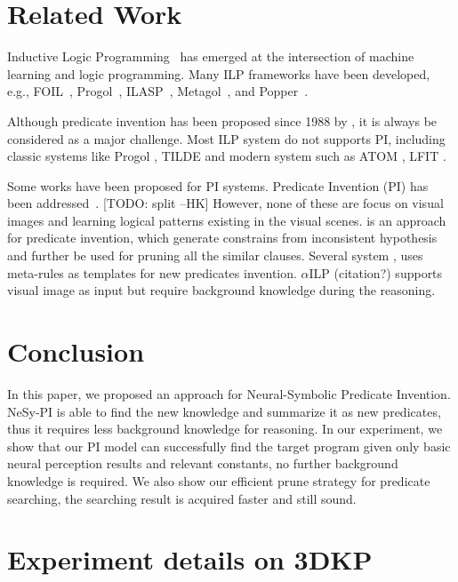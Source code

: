\documentclass[
]{ceurart}
\newcommand{\hk}[1]{\textcolor{Apricot}{[#1 \textsc{--HK}]}}
\begin{document}
	
	
	\section{Related Work}
	Inductive Logic Programming~\cite{Muggleton91,Muggleton95,Nienhuys97,Cropper20} has emerged at the intersection of machine learning and logic programming. Many ILP frameworks have been developed, e.g., FOIL~\cite{Quinlan90}, Progol~\cite{Muggleton95}, ILASP~\cite{ILASP}, Metagol~\cite{metagol,Cropper2019LearningHL}, and Popper~\cite{popper}.
	
	Although predicate invention has been proposed since 1988 by \cite{MUGGLETON1988339}, it is always be considered as a major challenge. Most ILP system do not supports PI, including classic systems like Progol \cite{Muggleton1995InverseEA}, TILDE\cite{BLOCKEEL1998285} and modern system such as ATOM \cite{atom}, LFIT \cite{LFIT}.
	
	Some works have been proposed for PI systems. 
	Predicate Invention (PI) has been addressed~\cite{Stahl93PI,aAthakravi12PI,Cropper2019LearningHL,Hocquette20ijcaiPI,Kok2007StatisticalPI,KramerAustrian2007PI,Cropper_Morel_Muggleton_2020aaaiPI,Cropper21PI}. \hk{TODO: split}
	However, none of these are focus on visual images and learning logical patterns existing in the visual scenes. 
	\cite{pilff} is an approach for predicate invention, which generate constrains from inconsistent hypothesis and further be used for pruning all the similar clauses.
	Several system \cite{Evans2018}, \cite{kaminski_eiter_inoue_2018} uses meta-rules as templates for new predicates invention. 
	$ \alpha $ILP (citation?) supports visual image as input but require background knowledge during the reasoning.
	
	
	\section{Conclusion}
	
	In this paper, we proposed an approach for Neural-Symbolic Predicate Invention. NeSy-PI is able to find the new knowledge and summarize it as new predicates, thus it requires less background knowledge for reasoning.
	In our experiment, we show that our PI model can successfully find the target program given only basic neural perception results and relevant constants, no further background knowledge is required. We also show our efficient prune strategy for predicate searching, the searching result is acquired faster and still sound.
	\appendix
	\section{Experiment details on 3DKP}
	
\end{document}
